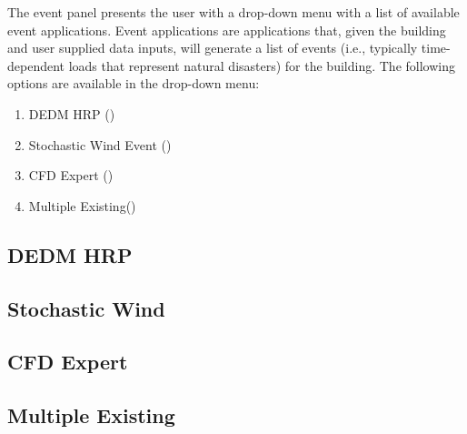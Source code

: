 The event panel presents the user with a drop-down menu with a list of
available event applications. Event applications are applications
that, given the building and user supplied data inputs, will generate
a list of events (i.e., typically time-dependent loads that represent natural disasters) for the building. The following options
are available in the drop-down menu:

\begin{enumerate}
\item DEDM HRP ()
\item Stochastic Wind Event ()
\item CFD Expert ()
\item Multiple Existing()
\end{enumerate}

\subsection{DEDM HRP}
\label{subsec:dedm_hrp}


\subsection{Stochastic Wind}
\label{subsec:stochastic_wind}


\subsection{CFD Expert}
\label{subsec:cfd_expert}


\subsection{Multiple Existing}
\label{subsec:multiple_existing}

